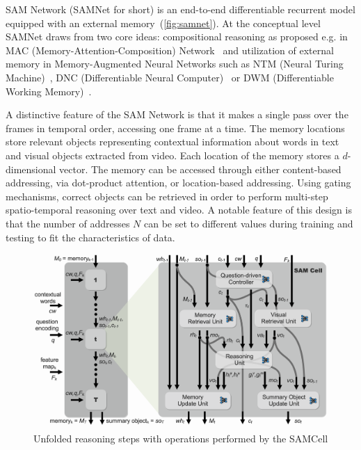 SAM Network (SAMNet for short) is an end-to-end differentiable recurrent model equipped with an external memory~(\cref{fig:samnet}).
At the conceptual level SAMNet draws from two core ideas:
compositional reasoning as proposed e.g. in MAC (Memory-Attention-Composition) Network~\cite{hudson2018compositional,marois2018transfer}
and utilization of external memory in Memory-Augmented Neural Networks such as NTM (Neural Turing Machine)~\cite{graves2014neural}, DNC (Differentiable Neural Computer)~\cite{graves2016hybrid} or DWM (Differentiable Working Memory)~\cite{jayram2018learning}.

A distinctive feature of the SAM Network is that it makes a single pass over the frames in temporal order, accessing one frame at a time.
The memory locations store relevant objects representing contextual information about words in text and visual objects extracted from video. 
Each location of the memory stores a $d$-dimensional vector. %
The memory can be accessed through either content-based addressing, via dot-product attention, or location-based addressing. 
Using gating mechanisms, correct objects can be retrieved 
in order to perform multi-step spatio-temporal reasoning over text and video.  
A notable feature of this design is that the number of addresses $N$ can be set to different values during training and testing to fit the characteristics of data.


\begin{figure}[t!]
	\centering
	\includegraphics[width=\textwidth]{img/architecture/samcell_reasoning}
	\caption{Unfolded reasoning steps with operations performed by the SAMCell}
	\label{fig:samcell}
\end{figure}


